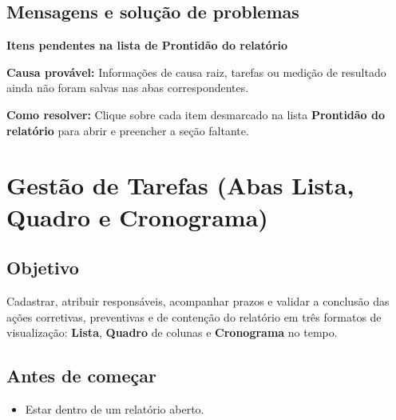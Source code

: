 \subsection*{Mensagens e solução de problemas}

\begin{remark}
\textbf{Itens pendentes na lista de Prontidão do relatório}\par
\textbf{Causa provável:} Informações de causa raiz, tarefas ou medição de resultado ainda não foram salvas nas abas correspondentes.\par
\textbf{Como resolver:} Clique sobre cada item desmarcado na lista \textbf{Prontidão do relatório} para abrir e preencher a seção faltante.
\end{remark}

\Needspace{190pt}
\section{Gestão de Tarefas (Abas Lista, Quadro e Cronograma)}

\subsection*{Objetivo}

Cadastrar, atribuir responsáveis, acompanhar prazos e validar a conclusão das ações corretivas, preventivas e de contenção do relatório em três formatos de visualização: \textbf{Lista}, \textbf{Quadro} de colunas e \textbf{Cronograma} no tempo.\par

\subsection*{Antes de começar}

\begin{itemize}
\item Estar dentro de um relatório aberto.
\end{itemize}


